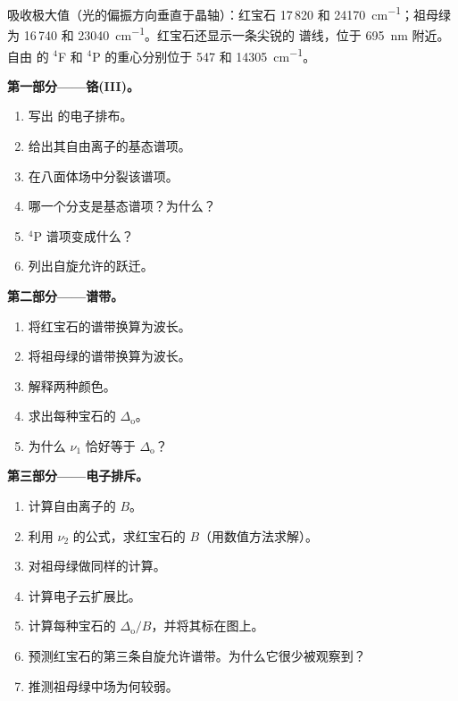 \begin{problem}
\label{pb:b3:complex-spectra-magnetism:1}
吸收极大值（光的偏振方向垂直于晶轴）：红宝石
17\,820 和 \qty{24170}{cm^{-1}}；祖母绿为 16\,740 和 \qty{23040}{cm^{-1}}。红宝石还显示一条尖锐的
谱线，位于 \qty{695}{nm} 附近。自由  的 $^4$F 和 $^4$P 的重心分别位于 547 和 \qty{14305}{cm^{-1}}。

\medskip\noindent\textbf{第一部分——铬(III)。}
\begin{enumerate}
  \item 写出  的电子排布。
  \item 给出其自由离子的基态谱项。
  \item 在八面体场中分裂该谱项。
  \item 哪一个分支是基态谱项？为什么？
  \item $^4$P 谱项变成什么？
  \item 列出自旋允许的跃迁。
\end{enumerate}

\medskip\noindent\textbf{第二部分——谱带。}
\begin{enumerate}[resume]
  \item 将红宝石的谱带换算为波长。
  \item 将祖母绿的谱带换算为波长。
  \item 解释两种颜色。
  \item 求出每种宝石的 $\Delta_{\mathrm o}$。
  \item 为什么 $\nu_1$ 恰好等于 $\Delta_{\mathrm o}$？
\end{enumerate}

\medskip\noindent\textbf{第三部分——电子排斥。}
\begin{enumerate}[resume]
  \item 计算自由离子的 $B$。
  \item 利用 $\nu_2$ 的公式，求红宝石的 $B$（用数值方法求解）。
  \item 对祖母绿做同样的计算。
  \item 计算电子云扩展比。
  \item 计算每种宝石的 $\Delta_{\mathrm o}/B$，并将其标在图上。
  \item 预测红宝石的第三条自旋允许谱带。为什么它很少被观察到？
  \item 推测祖母绿中场为何较弱。
\end{enumerate}


\end{problem}
